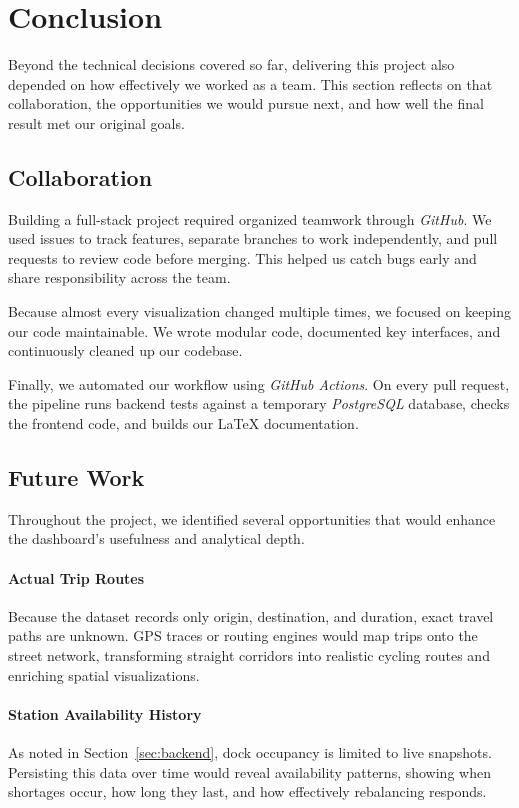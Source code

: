 \section{Conclusion}\label{sec:conclusion}
Beyond the technical decisions covered so far, delivering this project also depended on how effectively we worked as a team.
This section reflects on that collaboration, the opportunities we would pursue next, and how well the final result met our original goals.

\subsection{Collaboration}
Building a full-stack project required organized teamwork through \emph{GitHub}.
We used issues to track features, separate branches to work independently, and pull requests to review code before merging.
This helped us catch bugs early and share responsibility across the team.

Because almost every visualization changed multiple times, we focused on keeping our code maintainable.
We wrote modular code, documented key interfaces, and continuously cleaned up our codebase.

Finally, we automated our workflow using \emph{GitHub Actions}.
On every pull request, the pipeline runs backend tests against a temporary \emph{PostgreSQL} database, checks the frontend code, and builds our \LaTeX{} documentation.

\subsection{Future Work}
Throughout the project, we identified several opportunities that would enhance the dashboard's usefulness and analytical depth.

\paragraph{Actual Trip Routes}
Because the dataset records only origin, destination, and duration, exact travel paths are unknown.
GPS traces or routing engines would map trips onto the street network, transforming straight corridors into realistic cycling routes and enriching spatial visualizations.

\paragraph{Station Availability History}
As noted in Section~\ref{sec:backend}, dock occupancy is limited to live snapshots.
Persisting this data over time would reveal availability patterns, showing when shortages occur, how long they last, and how effectively rebalancing responds.


